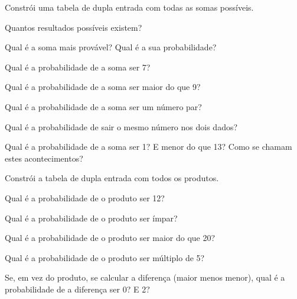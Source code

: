 \documentclass[12pt]{article}
\begin{document}


\begin{exercicios}
  \item Constrói uma tabela de dupla entrada com todas as somas possíveis.
  \item Quantos resultados possíveis existem?
  \item Qual é a soma mais provável? Qual é a sua probabilidade?
  \item Qual é a probabilidade de a soma ser 7?
  \item Qual é a probabilidade de a soma ser maior do que 9?
  \item Qual é a probabilidade de a soma ser um número par?
  \item Qual é a probabilidade de sair o mesmo número nos dois dados?
  \item Qual é a probabilidade de a soma ser 1? E menor do que 13? Como se chamam estes acontecimentos?
\end{exercicios}

\begin{exercicios}
  \item Constrói a tabela de dupla entrada com todos os produtos.
  \item Qual é a probabilidade de o produto ser 12?
  \item Qual é a probabilidade de o produto ser ímpar?
  \item Qual é a probabilidade de o produto ser maior do que 20?
  \item Qual é a probabilidade de o produto ser múltiplo de 5?
  \item Se, em vez do produto, se calcular a diferença (maior menos menor), qual é a probabilidade de a diferença ser 0? E 2?
\end{exercicios}
\end{document}
